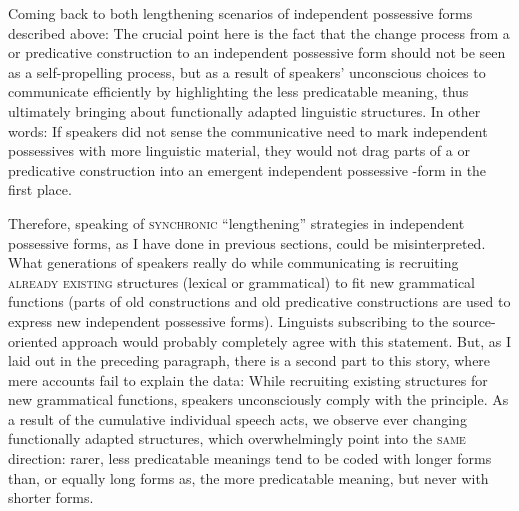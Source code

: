 \documentclass[output=paper]{langsci/langscibook}
\begin{document}
Coming back to both lengthening scenarios of independent possessive forms described above: The crucial point here is the fact that the change process from a  or predicative construction to an independent possessive form should not be seen as a self-propelling  process, but as a result of speakers' unconscious choices to communicate efficiently by highlighting the less predicatable meaning, thus ultimately bringing about functionally adapted linguistic structures. In other words: If speakers did not sense the communicative need to mark independent possessives with more linguistic material, they would not drag parts of a  or predicative construction into an emergent independent possessive -form in the first place. 

Therefore, speaking of \textsc{synchronic} “lengthening” strategies in independent possessive forms, as I have done in previous sections, could be misinterpreted. What generations of speakers really do while communicating is recruiting \textsc{already} \textsc{existing} structures (lexical or grammatical) to fit new grammatical functions (parts of old  constructions and old predicative constructions are used to express new independent possessive forms). Linguists subscribing to the source-oriented approach would probably completely agree with this statement. But, as I laid out in the preceding paragraph, there is a second part to this story, where mere  accounts fail to explain the data: While recruiting existing structures for new grammatical functions, speakers unconsciously comply with the  principle. As a result of the cumulative individual speech acts, we observe ever changing functionally adapted structures, which overwhelmingly point into the \textsc{same} direction: rarer, less predicatable meanings tend to be coded with longer forms than, or equally long forms as, the more predicatable meaning, but never with shorter forms. 
\end{document}
